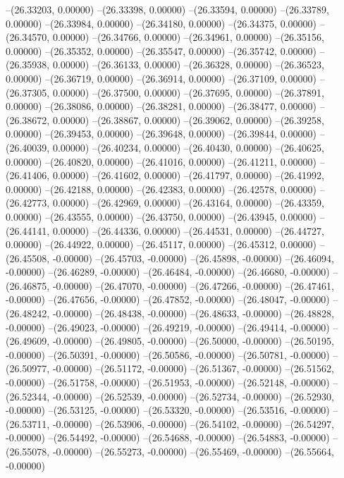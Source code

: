 --(26.33203, 0.00000)
--(26.33398, 0.00000)
--(26.33594, 0.00000)
--(26.33789, 0.00000)
--(26.33984, 0.00000)
--(26.34180, 0.00000)
--(26.34375, 0.00000)
--(26.34570, 0.00000)
--(26.34766, 0.00000)
--(26.34961, 0.00000)
--(26.35156, 0.00000)
--(26.35352, 0.00000)
--(26.35547, 0.00000)
--(26.35742, 0.00000)
--(26.35938, 0.00000)
--(26.36133, 0.00000)
--(26.36328, 0.00000)
--(26.36523, 0.00000)
--(26.36719, 0.00000)
--(26.36914, 0.00000)
--(26.37109, 0.00000)
--(26.37305, 0.00000)
--(26.37500, 0.00000)
--(26.37695, 0.00000)
--(26.37891, 0.00000)
--(26.38086, 0.00000)
--(26.38281, 0.00000)
--(26.38477, 0.00000)
--(26.38672, 0.00000)
--(26.38867, 0.00000)
--(26.39062, 0.00000)
--(26.39258, 0.00000)
--(26.39453, 0.00000)
--(26.39648, 0.00000)
--(26.39844, 0.00000)
--(26.40039, 0.00000)
--(26.40234, 0.00000)
--(26.40430, 0.00000)
--(26.40625, 0.00000)
--(26.40820, 0.00000)
--(26.41016, 0.00000)
--(26.41211, 0.00000)
--(26.41406, 0.00000)
--(26.41602, 0.00000)
--(26.41797, 0.00000)
--(26.41992, 0.00000)
--(26.42188, 0.00000)
--(26.42383, 0.00000)
--(26.42578, 0.00000)
--(26.42773, 0.00000)
--(26.42969, 0.00000)
--(26.43164, 0.00000)
--(26.43359, 0.00000)
--(26.43555, 0.00000)
--(26.43750, 0.00000)
--(26.43945, 0.00000)
--(26.44141, 0.00000)
--(26.44336, 0.00000)
--(26.44531, 0.00000)
--(26.44727, 0.00000)
--(26.44922, 0.00000)
--(26.45117, 0.00000)
--(26.45312, 0.00000)
--(26.45508, -0.00000)
--(26.45703, -0.00000)
--(26.45898, -0.00000)
--(26.46094, -0.00000)
--(26.46289, -0.00000)
--(26.46484, -0.00000)
--(26.46680, -0.00000)
--(26.46875, -0.00000)
--(26.47070, -0.00000)
--(26.47266, -0.00000)
--(26.47461, -0.00000)
--(26.47656, -0.00000)
--(26.47852, -0.00000)
--(26.48047, -0.00000)
--(26.48242, -0.00000)
--(26.48438, -0.00000)
--(26.48633, -0.00000)
--(26.48828, -0.00000)
--(26.49023, -0.00000)
--(26.49219, -0.00000)
--(26.49414, -0.00000)
--(26.49609, -0.00000)
--(26.49805, -0.00000)
--(26.50000, -0.00000)
--(26.50195, -0.00000)
--(26.50391, -0.00000)
--(26.50586, -0.00000)
--(26.50781, -0.00000)
--(26.50977, -0.00000)
--(26.51172, -0.00000)
--(26.51367, -0.00000)
--(26.51562, -0.00000)
--(26.51758, -0.00000)
--(26.51953, -0.00000)
--(26.52148, -0.00000)
--(26.52344, -0.00000)
--(26.52539, -0.00000)
--(26.52734, -0.00000)
--(26.52930, -0.00000)
--(26.53125, -0.00000)
--(26.53320, -0.00000)
--(26.53516, -0.00000)
--(26.53711, -0.00000)
--(26.53906, -0.00000)
--(26.54102, -0.00000)
--(26.54297, -0.00000)
--(26.54492, -0.00000)
--(26.54688, -0.00000)
--(26.54883, -0.00000)
--(26.55078, -0.00000)
--(26.55273, -0.00000)
--(26.55469, -0.00000)
--(26.55664, -0.00000)
